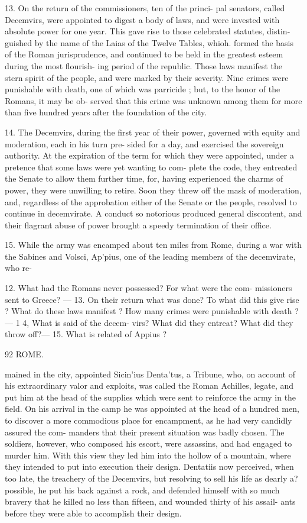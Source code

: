 \documentclass[openany,a4paper]{memoir}
\begin{document}
{13. On the return of the commissioners, ten of the princi- 
pal senators, called Decemvirs, were appointed to digest a 
body of laws, and were invested with absolute power for one 
year. This gave rise to those celebrated statutes, distin- 
guished by the name of the Laias of the Twelve Tables, whioh. 
formed the basis of the Roman jurisprudence, and continued 
to be held in the greatest esteem during the most flourish- 
ing period of the republic. Those laws manifest the stern 
spirit of the people, and were marked by their severity. 
Nine crimes were punishable with death, one of which was 
parricide ; but, to the honor of the Romans, it may be ob- 
served that this crime was unknown among them for more 
than five hundred years after the foundation of the city. 

14. The Decemvirs, during the first year of their power, 
governed with equity and moderation, each in his turn pre- 
sided for a day, and exercised the sovereign authority. At 
the expiration of the term for which they were appointed, 
under a pretence that some laws were yet wanting to com- 
plete the code, they entreated the Senate to allow them 
further time, for, having experienced the charms of power, 
they were unwilling to retire. Soon they threw off the mask 
of moderation, and, regardless of the approbation either of 
the Senate or the people, resolved to continue in decemvirate. 
A conduct so notorious produced general discontent, and 
their flagrant abuse of power brought a speedy termination 
of their office. 

15. While the army was encamped about ten miles from 
Rome, during a war with the Sabines and Volsci, Ap'pius, 
one of the leading members of the decemvirate, who re- 

12. What had the Romans never possessed? For what were the com- 
missioners sent to Greece? — 13. On their return what was done? To 
what did this give rise ? What do these laws manifest ? How many 
crimes were punishable with death ? — 1 4, What is said of the decem- 
virs? What did they entreat? What did they throw off?— 15. What 
is related of Appius ? 



92 ROME. 

mained in the city, appointed Sicin'ius Denta'tus, a Tribune, 
who, on account of his extraordinary valor and exploits, was 
called the Roman Achilles, legate, and put him at the head 
of the supplies which were sent to reinforce the army in the 
field. On his arrival in the camp he was appointed at the 
head of a hundred men, to discover a more commodious place 
for encampment, as he had very candidly assured the com- 
manders that their present situation was badly chosen. The 
soldiers, however, who composed his escort, were assassins, 
and had engaged to murder him. With this view they led 
him into the hollow of a mountain, where they intended to 
put into execution their design. Dentatiis now perceived, 
when too late, the treachery of the Decemvirs, but resolving 
to sell his life as dearly a? possible, he put his back against 
a rock, and defended himself with so much bravery that he 
killed no less than fifteen, and wounded thirty of his assail- 
ants before they were able to accomplish their design. 

}
\end{document}
